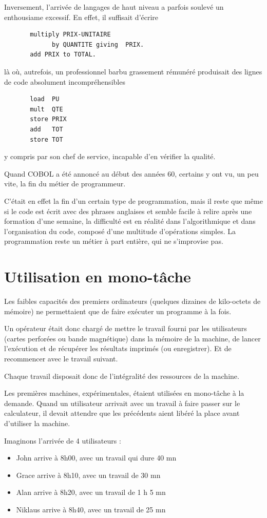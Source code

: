 \begin{multicols}{2}
Inversement, l'arrivée de langages de haut niveau a parfois soulevé
un enthousiame excessif.  En effet, il suffisait d'écrire
\begin{lstlisting}
       multiply PRIX-UNITAIRE 
             by QUANTITE giving  PRIX.
       add PRIX to TOTAL.
\end{lstlisting}
là où, autrefois, un professionnel barbu grassement rémunéré
produisait des  lignes de code absolument incompréhensibles
\begin{lstlisting}
       load  PU
       mult  QTE
       store PRIX
       add   TOT
       store TOT
\end{lstlisting}
y compris par son chef de service, incapable d'en vérifier la qualité.

Quand COBOL a été annoncé au début des années 60, certains y ont vu,
un peu vite, la fin du métier de programmeur.

C'était en effet la fin d'un certain type de programmation, mais il
reste que même si le code est écrit avec des phrases anglaises et
semble facile à relire après une formation d'une semaine, la
difficulté est en réalité dans l'algorithmique et dans l'organisation
du code, composé d'une multitude d'opérations simples.  La
programmation reste un métier à part entière, qui ne s'improvise pas.

\section{Utilisation en mono-tâche}

Les faibles capacités des premiers ordinateurs (quelques dizaines de
kilo-octets de mémoire) ne permettaient que de faire exécuter un
programme à la fois.

Un opérateur était donc chargé de mettre le travail fourni par les
utilisateurs (cartes perforées ou bande magnétique) dans la mémoire de
la machine, de lancer l'exécution et de récupérer les résultats
imprimés (ou enregistrer). Et de recommencer avec le travail suivant.

Chaque travail disposait donc de l'intégralité des ressources de la
machine.

 \begin{exercice}
Les premières machines, expérimentales,
étaient utilisées en mono-tâche à la demande. Quand un utilisateur
arrivait avec un travail à faire passer sur le calculateur, il devait
attendre que les précédents aient libéré la place avant d'utiliser la
machine.

Imaginons l'arrivée de 4 utilisateurs : 
\begin {itemize}
\item John arrive à 8h00, avec un travail qui dure 40 mn
\item Grace arrive à 8h10, avec un travail de 30 mn
\item Alan arrive à 8h20, avec un travail de 1 h 5 mn
\item Niklaus arrive à 8h40, avec un travail de 25 mn
\end {itemize}


\end{exercice}
\end{multicols}
